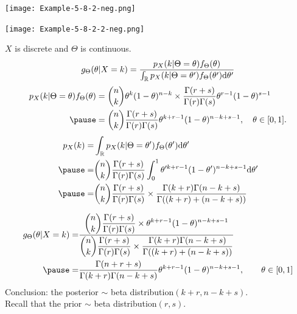 \begin{frame}
 \begin{center}
 \texttt{[image: Example-5-8-2-neg.png]}
\end{center}
\end{frame}
\begin{frame}
\begin{center}
 \texttt{[image: Example-5-8-2-2-neg.png]}
\end{center}

\end{frame}
\begin{frame}
  $X$ is discrete and $\Theta$ is continuous.
  \[
 g_\Theta(\theta|X=k) = \frac{p_X(k|\Theta=\theta) f_\Theta(\theta)}{\int_{\mathbb{R}} p_X(k|\Theta=\theta') f_\Theta(\theta')\mathrm{d} \theta'}
  \] \pause
  \begin{align*}
  p_X(k|\Theta=\theta) f_\Theta(\theta)
  &= {n\choose k} \theta^k (1-\theta)^{n-k} \times \frac{\Gamma(r+s)}{\Gamma(r)\Gamma(s)}\theta^{r-1}(1-\theta)^{s-1}\\ \pause
  &= {n\choose k} \frac{\Gamma(r+s)}{\Gamma(r)\Gamma(s)} \theta^{k+r-1} (1-\theta)^{n-k+s-1},\quad \theta\in[0,1].
  \end{align*}\pause
\begin{align*}
p_X(k) =& \int_\R p_X(k|\Theta=\theta') f_\Theta(\theta') \ud\theta'\\ \pause
=& {n\choose k} \frac{\Gamma(r+s)}{\Gamma(r)\Gamma(s)}  \int_0^1 \theta'^{k+r-1} (1-\theta')^{n-k+s-1}\ud \theta'\\ \pause
=& {n\choose k} \frac{\Gamma(r+s)}{\Gamma(r)\Gamma(s)}  \times \frac{\Gamma(k+r)\Gamma(n-k+s)}{\Gamma((k+r)+(n-k+s))}
\end{align*}
\end{frame}
\begin{frame}
 \begin{align*}
  g_\Theta(\theta|X=k) =& \frac{\displaystyle {n\choose k} \frac{\Gamma(r+s)}{\Gamma(r)\Gamma(s)} \times \theta^{k+r-1} (1-\theta)^{n-k+s-1}}{\displaystyle {n\choose k} \frac{\Gamma(r+s)}{\Gamma(r)\Gamma(s)}  \times \frac{\Gamma(k+r)\Gamma(n-k+s)}{\Gamma((k+r)+(n-k+s))}} \\ \pause
  = & \frac{\Gamma(n+r+s)}{\Gamma(k+r)\Gamma(n-k+s)} \theta^{k+r-1} (1-\theta)^{n-k+s-1}, \qquad \theta\in[0,1]
 \end{align*} \pause
 \vfill
Conclusion: the posterior $\sim$ beta distribution$(k+r, n-k+s)$. \\[1em]
Recall that the prior $\sim$ beta distribution$(r, s)$.
\end{frame}
